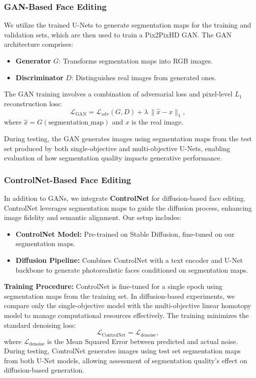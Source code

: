 \subsubsection{GAN-Based Face Editing}
\label{subsec:gan_integration}

We utilize the trained U-Nets to generate segmentation maps for the training and validation sets, which are then used to train a Pix2PixHD GAN. The GAN architecture comprises:

\begin{itemize}
    \item \textbf{Generator} \(G\): Transforms segmentation maps into RGB images.
    \item \textbf{Discriminator} \(D\): Distinguishes real images from generated ones.
\end{itemize}

The GAN training involves a combination of adversarial loss and pixel-level \(L_1\) reconstruction loss:
\[
\mathcal{L}_{\mathrm{GAN}} = \mathcal{L}_{\mathrm{adv}}(G, D) + \lambda \, \|\hat{x} - x\|_1,
\]
where \(\hat{x} = G(\text{segmentation\_map})\) and \(x\) is the real image.

During testing, the GAN generates images using segmentation maps from the test set produced by both single-objective and multi-objective U-Nets, enabling evaluation of how segmentation quality impacts generative performance.

\subsubsection{ControlNet-Based Face Editing}
\label{subsec:controlnet_integration}

In addition to GANs, we integrate \textbf{ControlNet} \cite{zhang2023adding} for diffusion-based face editing. ControlNet leverages segmentation maps to guide the diffusion process, enhancing image fidelity and semantic alignment. Our setup includes:

\begin{itemize}
    \item \textbf{ControlNet Model:} Pre-trained on Stable Diffusion, fine-tuned on our segmentation maps.
    \item \textbf{Diffusion Pipeline:} Combines ControlNet with a text encoder and U-Net backbone to generate photorealistic faces conditioned on segmentation maps.
\end{itemize}

\textbf{Training Procedure:} ControlNet is fine-tuned for a single epoch using segmentation maps from the training set. In diffusion-based experiments, we compare only the single-objective model with the multi-objective linear homotopy model to manage computational resources effectively. The training minimizes the standard denoising loss:
\[
\mathcal{L}_{\mathrm{ControlNet}} = \mathcal{L}_{\mathrm{denoise}},
\]
where \(\mathcal{L}_{\mathrm{denoise}}\) is the Mean Squared Error between predicted and actual noise. During testing, ControlNet generates images using test set segmentation maps from both U-Net models, allowing assessment of segmentation quality's effect on diffusion-based generation.

